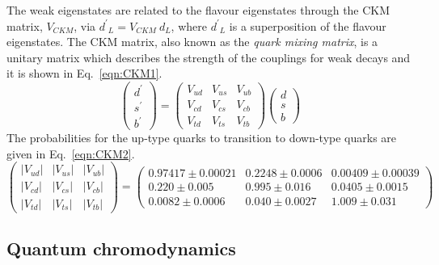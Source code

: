 The weak eigenstates are related to the flavour eigenstates through the CKM matrix, $V_{CKM}$, via ${d^{\prime}}_L = V_{CKM}~d_L$, where ${d^{\prime}}_L$ is a superposition of the flavour eigenstates. The CKM matrix, also known as the \emph{quark mixing matrix}, is a unitary matrix which describes the strength of the couplings for weak decays and it is shown in Eq.~\ref{eqn:CKM1}. 
\begin{equation}
\label{eqn:CKM1}
{\begin{pmatrix}
d^{\prime }\\
s^{\prime }\\
b^{\prime }
\end{pmatrix}}
=
{\begin{pmatrix}
V_{ud}&V_{us}&V_{ub}\\
V_{cd}&V_{cs}&V_{cb}\\
V_{td}&V_{ts}&V_{tb}
\end{pmatrix}}
{\begin{pmatrix}d\\s\\b
\end{pmatrix}}
\end{equation}
The probabilities for the up-type quarks to transition to down-type quarks are given in Eq.~\ref{eqn:CKM2}.
\begin{equation}
\label{eqn:CKM2}
{\begin{pmatrix}
|V_{ud}|&|V_{us}|&|V_{ub}|\\|V_{cd}|&|V_{cs}|&|V_{cb}|\\|V_{td}|&|V_{ts}|&|V_{tb}|
\end{pmatrix}}
=
{\begin{pmatrix}0.97417\pm 0.00021 & 0.2248\pm 0.0006 & 0.00409\pm{0.00039}\\
0.220\pm 0.005 & 0.995\pm 0.016 & 0.0405\pm{0.0015}\\
0.0082\pm{0.0006} & 0.040\pm{0.0027}&1.009\pm0.031
\end{pmatrix}}
\end{equation}



\subsection{Quantum chromodynamics}

